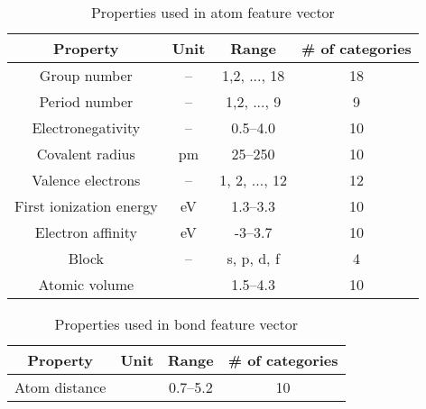 \documentclass[twocolumn, prl]{revtex4-1}
\begin{document}
\begin{table}[htb]\caption{Properties used in atom feature vector }
\begin{ruledtabular}
\begin{tabular}{cccc}
  Property        & Unit		&	Range           & \# of categories    \\
  \hline
  Group number    & --    	&  1,2, ..., 18   & 18 					\\
  Period number	& --			&  1,2, ..., 9\footnotemark[1]	& 9					\\
  Electronegativity\cite{sanderson1951interpretation, sanderson1952explanation}	& --			&  0.5--4.0		& 10					\\
  Covalent radius\cite{cordero2008covalent}		& pm		&  25--250		& 10					\\
  Valence electrons		& -- 			&	1, 2, ..., 12	& 12					\\
  First ionization energy\cite{kramida2013nist}\footnotemark[2]		& eV			& 1.3--3.3		& 10					\\
  Electron affinity\cite{haynes2014crc}		& eV			& -3--3.7			& 10					\\
  Block     & --            & s, p, d, f    &   4   \\
  Atomic volume\footnotemark[2] &  & 1.5--4.3  & 10  \\

\end{tabular}
\end{ruledtabular}
\label{tab:atom-feature}
\end{table}


\begin{table}[htb]\caption{Properties used in bond feature vector }
\begin{ruledtabular}
\begin{tabular}{cccc}
  Property        & Unit		&	Range           & \# of categories    \\
  \hline
  Atom distance    &     	&  0.7--5.2   & 10 					\\

\end{tabular}
\end{ruledtabular}
\label{tab:bond-feature}
\end{table}
\end{document}
